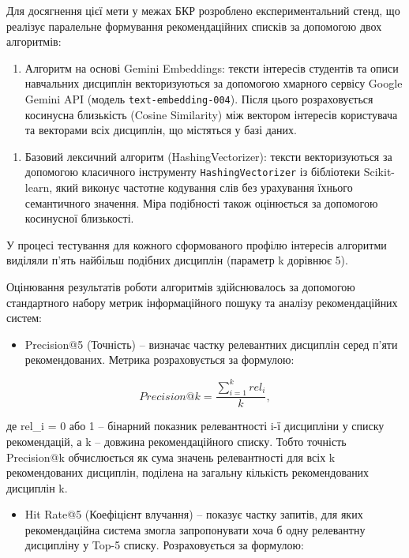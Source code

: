 \documentclass[
]{article}
\newcommand{\passthrough}[1]{#1}
\begin{document}
Для досягнення цієї мети у межах БКР розроблено експериментальний стенд,
що реалізує паралельне формування рекомендаційних списків за допомогою
двох алгоритмів:

\begin{enumerate}
\def\labelenumi{\arabic{enumi}.}
\item
  Алгоритм на основі Gemini Embeddings: тексти інтересів студентів та
  описи навчальних дисциплін векторизуються за допомогою хмарного
  сервісу Google Gemini API (модель
  \passthrough{\lstinline!text-embedding-004!}). Після цього
  розраховується косинусна близькість (Cosine Similarity) між вектором
  інтересів користувача та векторами всіх дисциплін, що містяться у базі
  даних.
\end{enumerate}

\begin{enumerate}
\def\labelenumi{\arabic{enumi}.}
\setcounter{enumi}{29}
\item
  Базовий лексичний алгоритм (HashingVectorizer): тексти векторизуються
  за допомогою класичного інструменту
  \passthrough{\lstinline!HashingVectorizer!} із бібліотеки
  Scikit-learn, який виконує частотне кодування слів без урахування
  їхнього семантичного значення. Міра подібності також оцінюється за
  допомогою косинусної близькості.
\end{enumerate}

У процесі тестування для кожного сформованого профілю інтересів
алгоритми виділяли п'ять найбільш подібних дисциплін (параметр k
дорівнює 5).

Оцінювання результатів роботи алгоритмів здійснювалось за допомогою
стандартного набору метрик інформаційного пошуку та аналізу
рекомендаційних систем:

\begin{itemize}
\item
  Precision@5 (Точність) -- визначає частку релевантних дисциплін серед
  п'яти рекомендованих. Метрика розраховується за формулою:
\end{itemize}

\[Precision@k = \frac{\sum_{i = 1}^{k}rel_{i}}{k},\]

де rel\_i = 0 або 1 -- бінарний показник релевантності i-ї дисципліни у
списку рекомендацій, а k -- довжина рекомендаційного списку. Тобто
точність Precision@k обчислюється як сума значень релевантності для всіх
k рекомендованих дисциплін, поділена на загальну кількість
рекомендованих дисциплін k.

\begin{itemize}
\item
  Hit Rate@5 (Коефіцієнт влучання) -- показує частку запитів, для яких
  рекомендаційна система змогла запропонувати хоча б одну релевантну
  дисципліну у Top-5 списку. Розраховується за формулою:
\end{itemize}
\end{document}

